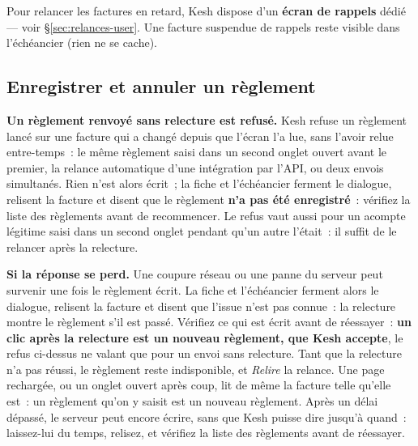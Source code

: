 \documentclass[a4paper,11pt,oneside]{article}
\begin{document}
Pour relancer les factures en retard, Kesh dispose d'un \textbf{écran de rappels} dédié — voir \S\ref{sec:relances-user}. Une facture suspendue de rappels reste visible dans l'échéancier (rien ne se cache).

\subsection{Enregistrer et annuler un règlement}\label{sec:reglement-client}

\textbf{Un règlement renvoyé sans relecture est refusé.} Kesh refuse un règlement lancé sur une
facture qui a changé depuis que l'écran l'a lue, sans l'avoir relue entre-temps~: le même règlement
saisi dans un second onglet ouvert avant le premier, la relance automatique d'une intégration par
l'API, ou deux envois simultanés. Rien n'est alors écrit~; la fiche et l'échéancier ferment le
dialogue, relisent la facture et disent que le règlement \textbf{n'a pas été enregistré}~: vérifiez
la liste des règlements avant de recommencer. Le refus vaut aussi pour un acompte légitime saisi
dans un second onglet pendant qu'un autre l'était~: il suffit de le relancer après la relecture.

\textbf{Si la réponse se perd.} Une coupure réseau ou une panne du serveur peut survenir une fois le
règlement écrit. La fiche et l'échéancier ferment alors le dialogue, relisent la facture et disent
que l'issue n'est pas connue~: la relecture montre le règlement s'il est passé. Vérifiez ce qui est
écrit avant de réessayer~: \textbf{un clic après la relecture est un nouveau règlement, que Kesh
accepte}, le refus ci-dessus ne valant que pour un envoi sans relecture. Tant que la relecture n'a pas
réussi, le règlement reste indisponible, et \emph{Relire} la relance. Une page rechargée, ou un onglet
ouvert après coup, lit de même la facture telle qu'elle est~: un règlement qu'on y saisit est un
nouveau règlement. Après un délai dépassé, le serveur peut encore écrire, sans que Kesh puisse dire
jusqu'à quand~: laissez-lui du temps, relisez, et vérifiez la liste des règlements avant de réessayer.
\end{document}
